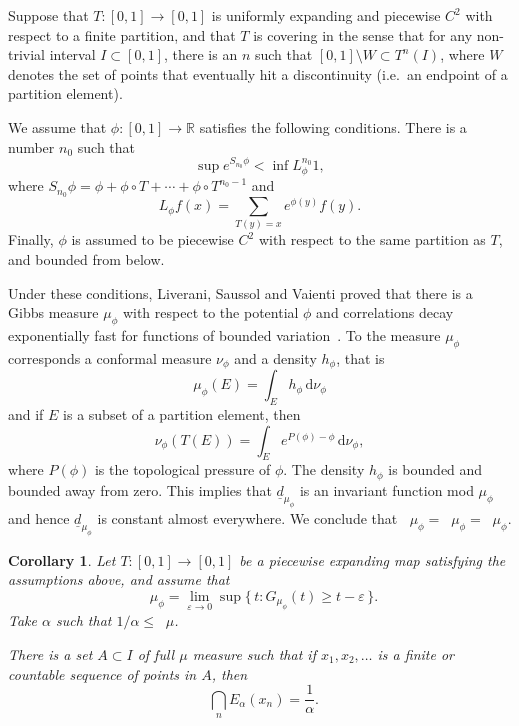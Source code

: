 \documentclass[11pt]{article}
\newtheorem{coro}[theo]{Corollary}
\theoremstyle{definition}
\numberwithin{equation}{section}
\numberwithin{figure}{section}
\numberwithin{table}{section}
\DeclareMathOperator{\dimh}{dim_H}
\DeclareMathOperator{\ldimh}{\underline{dim}_H}
\DeclareMathOperator{\udimh}{\overline{dim}_H}
\newcommand*{\dd}{\mathrm{d}}
\begin{document}
Suppose that $T \colon [0,1] \to [0,1]$ is uniformly expanding and piecewise $C^2$ with respect to a finite partition, and that $T$ is covering in the sense that for any non-trivial interval $I \subset [0,1]$, there is an $n$ such that $[0,1] \setminus W \subset T^n (I)$, where $W$ denotes the set of points that eventually hit a discontinuity (i.e.\ an endpoint of a partition element).

We assume that $\phi \colon [0,1] \to \mathbb{R}$ satisfies the following conditions. There is a number $n_0$ such that
\[
\sup e^{S_{n_0} \phi} < \inf L_\phi^{n_0} 1,
\]
where $S_{n_0} \phi = \phi + \phi \circ T + \cdots + \phi \circ T^{n_0-1}$ and
\[
L_\phi f (x) = \sum_{T(y) = x} e^{\phi (y)} f(y).
\]
Finally, $\phi$ is assumed to be piecewise $C^2$ with respect to the same partition as $T$, and bounded from below.

Under these conditions, Liverani, Saussol and Vaienti proved that there is a Gibbs measure $\mu_\phi$ with respect to the potential $\phi$ and correlations decay exponentially fast for functions of bounded variation~\cite[Theorem~3.1]{liveranietal}. To the measure $\mu_\phi$ corresponds a conformal measure $\nu_\phi$ and a density $h_\phi$, that is
\[
\mu_\phi (E) = \int_E h_\phi \, \dd\nu_\phi
\]
and if $E$ is a subset of a partition element, then
\[
\nu_\phi (T(E)) = \int_E e^{P(\phi) - \phi} \, \dd \nu_\phi,
\]
where $P(\phi)$ is the topological pressure of $\phi$. The density $h_\phi$ is bounded and bounded away from zero. This implies that $\underline{d}_{\mu_\phi}$ is an invariant function mod $\mu_\phi$ and hence $\underline{d}_{\mu_\phi}$ is constant almost everywhere. We conclude that $\dimh \mu_\phi = \ldimh \mu_\phi = \udimh \mu_\phi$.

\begin{coro}\label{cor:piecewise}
Let $T \colon [0,1] \to [0,1]$ be a piecewise expanding map satisfying the assumptions above, and assume that
\begin{equation}\label{eq:dim-coarse}
\dimh \mu_\phi = \lim_{\varepsilon \to 0} \sup \{\, t : G_{\mu_\phi} (t) \geq t - \varepsilon \,\}.
\end{equation}
Take $\alpha$ such that $1/\alpha \leq \dimh \mu$.

There is a set $A \subset I$ of full $\mu$ measure such that if $x_1, x_2, \ldots$ is a finite or countable sequence of points in $A$, then
\[
\dimh \bigcap_n E_\alpha (x_n) = \frac{1}{\alpha}.
\]
\end{coro}
\end{document}
